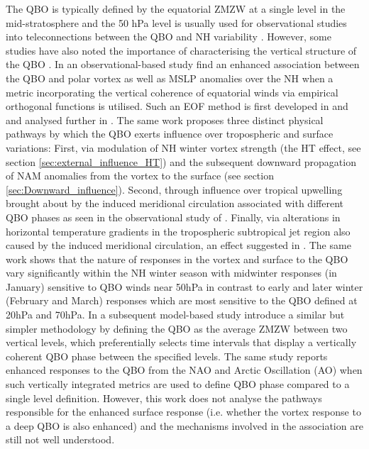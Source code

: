 The QBO is typically defined by the equatorial ZMZW at a single level in the mid-stratosphere and the 50 hPa level is usually used for observational studies into teleconnections between the QBO and NH variability \citep{baldwinQuasiBiennial2001}. However, some studies have also noted the importance of characterising the vertical structure of the QBO \citep{fraedrichEOF1993, wallaceRepresentation1993,  Baldwin98,  Dunkerton2017, graySurface2018b, andrewsObserved2019d}. In an observational-based study \cite{graySurface2018b} find an enhanced association between the QBO and polar vortex as well as MSLP anomalies over the NH when a metric incorporating the vertical coherence of equatorial winds via empirical orthogonal functions is utilised. Such an EOF method is first developed in \cite{fraedrichEOF1993} and \cite{wallaceRepresentation1993} and analysed further in \cite{verena2016a}. The same work proposes three distinct physical pathways by which the QBO exerts influence over tropospheric and surface variations: First, via modulation of NH winter vortex strength (the HT effect, see section \ref{sec:external_influence_HT}) and the subsequent downward propagation of NAM anomalies from the vortex to the surface (see section \ref{sec:Downward_influence}). Second, through influence over tropical upwelling brought about by the induced meridional circulation associated with different QBO phases as seen in the observational study of \cite{liessRelationship2012}. Finally, via alterations in horizontal temperature gradients in the tropospheric subtropical jet region also caused by the induced meridional circulation, an effect suggested in \cite{garfinkelInfluence2011}. The same work shows that the nature of responses in the vortex and surface to the QBO vary significantly within the NH winter season with midwinter responses (in January) sensitive to QBO winds near 50hPa in contrast to early and later winter (February and March) responses which are most sensitive to the QBO defined at 20hPa and 70hPa. In a subsequent model-based study \cite{andrewsObserved2019d} introduce a similar but simpler methodology by defining the QBO as the average ZMZW between two vertical levels, which preferentially selects time intervals that display a vertically coherent QBO phase between the specified levels. The same study reports enhanced responses to the QBO from the NAO and Arctic Oscillation (AO) when such vertically integrated metrics are used to define QBO phase compared to a single level definition. However, this work does not analyse the pathways responsible for the enhanced surface response (i.e. whether the vortex response to a deep QBO is also enhanced) and the mechanisms involved in the association are still not well understood. 

